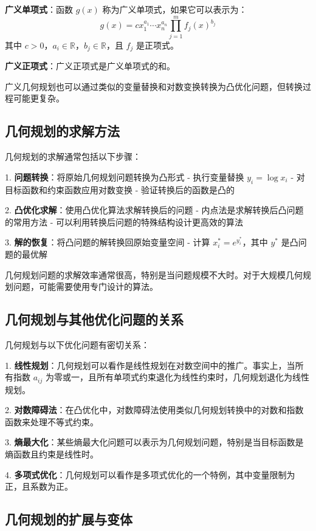 \documentclass[12pt,a4paper]{book}
\begin{document}
\textbf{广义单项式}：函数 $g(x)$ 称为广义单项式，如果它可以表示为：
$$
g(x) = c x_1^{a_1} \cdots x_n^{a_n} \prod_{j=1}^m f_j(x)^{b_j}
$$
其中 $c > 0$，$a_i \in \mathbb{R}$，$b_j \in \mathbb{R}$，且 $f_j$ 是正项式。

\textbf{广义正项式}：广义正项式是广义单项式的和。

广义几何规划也可以通过类似的变量替换和对数变换转换为凸优化问题，但转换过程可能更复杂。

\subsection{几何规划的求解方法}

几何规划的求解通常包括以下步骤：

1. \textbf{问题转换}：将原始几何规划问题转换为凸形式
   - 执行变量替换 $y_i = \log x_i$
   - 对目标函数和约束函数应用对数变换
   - 验证转换后的函数是凸的

2. \textbf{凸优化求解}：使用凸优化算法求解转换后的问题
   - 内点法是求解转换后凸问题的常用方法
   - 可以利用转换后问题的特殊结构设计更高效的算法

3. \textbf{解的恢复}：将凸问题的解转换回原始变量空间
   - 计算 $x_i^* = e^{y_i^*}$，其中 $y^*$ 是凸问题的最优解

几何规划问题的求解效率通常很高，特别是当问题规模不大时。对于大规模几何规划问题，可能需要使用专门设计的算法。

\subsection{几何规划与其他优化问题的关系}

几何规划与以下优化问题有密切关系：

1. \textbf{线性规划}：几何规划可以看作是线性规划在对数空间中的推广。事实上，当所有指数 $a_{ij}$ 为零或一，且所有单项式约束退化为线性约束时，几何规划退化为线性规划。

2. \textbf{对数障碍法}：在凸优化中，对数障碍法使用类似几何规划转换中的对数和指数函数来处理不等式约束。

3. \textbf{熵最大化}：某些熵最大化问题可以表示为几何规划问题，特别是当目标函数是熵函数且约束是线性时。

4. \textbf{多项式优化}：几何规划可以看作是多项式优化的一个特例，其中变量限制为正，且系数为正。

\subsection{几何规划的扩展与变体}
\end{document}
